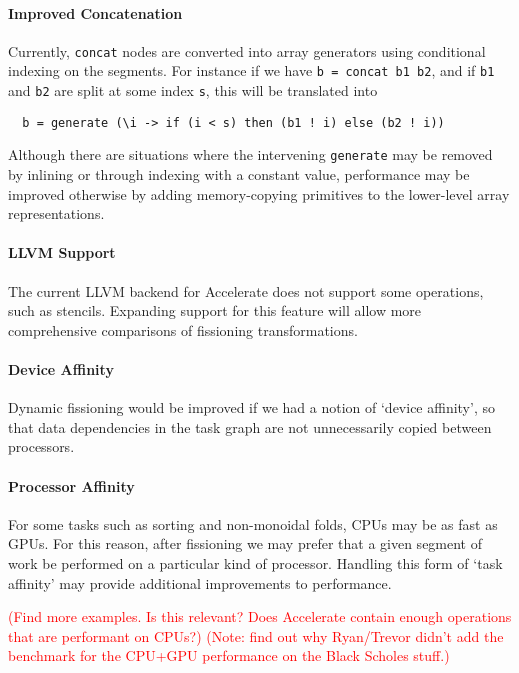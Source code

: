 \documentclass[a4paper,12pt]{article}
\newcommand{\red}[1]{\textcolor{red}{#1}}
\newcommand{\icf}[1]{\mbox{\texttt{#1}}} %
\begin{document}
\paragraph*{Improved Concatenation}
Currently, \icf{concat} nodes are converted into array generators using conditional indexing on the segments.
For instance if we have \icf{b\ =\ concat\ b1\ b2}, and if \icf{b1} and \icf{b2} are split at some index \icf{s}, this will be translated into

\begin{verbatim}
  b = generate (\i -> if (i < s) then (b1 ! i) else (b2 ! i))
\end{verbatim}

Although there are situations where the intervening \icf{generate} may be removed by inlining or through indexing with a constant value, performance may be improved otherwise by adding memory-copying primitives to the lower-level array representations.

\paragraph*{LLVM Support}
The current LLVM backend for Accelerate does not support some operations, such as stencils.
Expanding support for this feature will allow more comprehensive comparisons of fissioning transformations.

\paragraph*{Device Affinity}
Dynamic fissioning would be improved if we had a notion of `device affinity', so that data dependencies in the task graph are not unnecessarily copied between processors.

\paragraph*{Processor Affinity}
For some tasks such as sorting and non-monoidal folds, CPUs may be as fast as GPUs.
For this reason, after fissioning we may prefer that a given segment of work be performed on a particular kind of processor.
Handling this form of `task affinity' may provide additional improvements to performance.
    
\red{(Find more examples. Is this relevant? Does Accelerate contain enough operations that are performant on CPUs?)}
\red{(Note: find out why Ryan/Trevor didn't add the benchmark for the CPU+GPU performance on the Black Scholes stuff.)}
\end{document}

